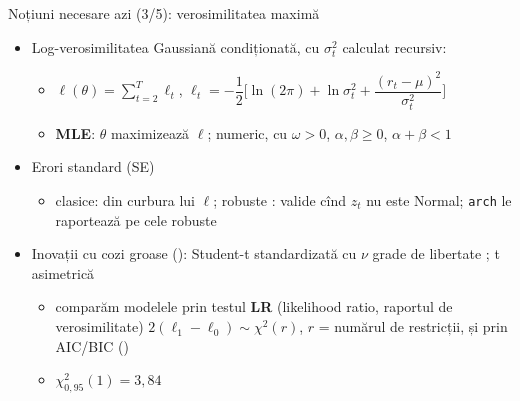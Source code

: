 \begin{frame}{Noțiuni necesare azi (3/5): verosimilitatea maximă}
\itemsize{\small}
\begin{itemize}
    \item Log-verosimilitatea Gaussiană condiționată, cu $\sigma_t^2$ calculat recursiv:
    \begin{itemize}
        \item $\ell(\theta) = \sum_{t=2}^{T}\ell_t$, \quad $\ell_t = -\dfrac12\Big[\ln(2\pi) + \ln\sigma_t^2 + \dfrac{(r_t - \mu)^2}{\sigma_t^2}\Big]$
        \item \textbf{MLE}: $\hat\theta$ maximizează $\ell$; numeric, cu $\omega > 0$, $\alpha, \beta \ge 0$, $\alpha + \beta < 1$
    \end{itemize}
    \item Erori standard (SE)
    \begin{itemize}
        \item clasice: din curbura lui $\ell$; robuste : valide cînd $z_t$ nu este Normal; \texttt{arch} le raportează pe cele robuste
    \end{itemize}
    \item Inovații cu cozi groase (): Student-t standardizată cu $\nu$ grade de libertate ; t asimetrică 
    \begin{itemize}
        \item comparăm modelele prin testul \textbf{LR} (likelihood ratio, raportul de verosimilitate) $2(\ell_1 - \ell_0) \sim \chi^2(r)$, $r$ = numărul de restricții, și prin AIC/BIC ()
        \item $\chi^2_{0{,}95}(1) = 3{,}84$
    \end{itemize}
\end{itemize}
\end{frame}

